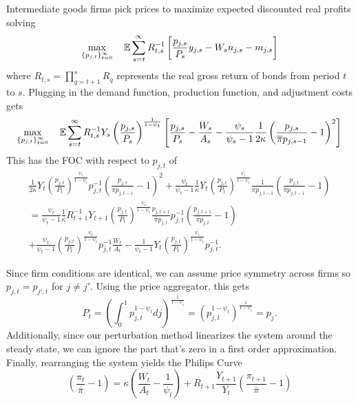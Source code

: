 Intermediate goods firms pick prices to maximize expected discounted real profits solving
\begin{equation*}
    \max_{\{p_{j, t}\}_{t = 0}^\infty} \quad \mathbb{E} \sum_{s = t}^\infty R_{t, s}^{-1} \left[ \frac{p_{j, s}}{P_s} y_{j, s} - W_s n_{j, s} - m_{j, s} \right]
\end{equation*}
where $R_{t, s} = \prod_{q = t + 1}^s R_q$ represents the real gross return of bonds from period $t$ to $s$. Plugging in the demand function, production function, and adjustment costs gets
\begin{equation*}
    \max_{\{p_{j, t}\}_{t = 0}^\infty} \quad \mathbb{E} \sum_{s = t}^\infty R_{t, s}^{-1} Y_s \left(\frac{p_{j, s}}{P_s}\right)^\frac{1}{1 - \psi_t} \left[ \frac{p_{j, s}}{P_s} - \frac{W_s}{A_s} - \frac{\psi_s}{\psi_s - 1} \frac{1}{2 \kappa} \left(\frac{p_{j, s}}{{\overline{\pi} p_{j, s - 1}}} - 1\right)^2 \right]
\end{equation*}
This has the FOC with respect to $p_{j, t}$ of
\begin{align*}
    \frac{1}{2 \kappa} Y_t \left(\frac{p_{j, t}}{P_t}\right)^\frac{\psi_t}{1 - \psi_t} p_{j, t}^{-1} \left(\frac{p_{j, t}}{\overline{\pi} p_{j, t-1}} - 1\right)^2 + \frac{\psi_t}{\psi_t - 1} \frac{1}{\kappa} Y_t \left(\frac{p_{j, t}}{P_t}\right)^\frac{\psi_t}{1 - \psi_t} \frac{1}{\overline{\pi} p_{j, t-1}}\left(\frac{p_{j, t}}{\overline{\pi} p_{j, t-1}} - 1\right) \\
    = \frac{\psi_t}{\psi_t - 1} \frac{1}{\kappa} R_{t+1}^{-1} Y_{t+1} \left(\frac{p_{j, t}}{P_t}\right)^\frac{\psi_t}{1 - \psi_t} \frac{p_{j, t+1}}{\overline{\pi} p_{j, t}} p_{j, t}^{-1} \left(\frac{p_{j, t+1}}{\overline{\pi} p_{j, t}} - 1\right) \\
    + \frac{\psi_t}{\psi_t - 1} \left(\frac{p_{j, t}}{P_t}\right)^\frac{\psi_t}{1 - \psi_t} p_{j, t}^{-1} \frac{W_t}{A_t} - \frac{1}{\psi_t - 1} Y_t \left(\frac{p_{j, t}}{P_t}\right)^\frac{\psi_t}{1 - \psi_t} p_{j, t}^{-1}.
\end{align*}

Since firm conditions are identical, we can assume price symmetry across firms so $p_{j, t} = p_{j', t}$ for $j \neq j'$. Using the price aggregator, this gets
\begin{equation*}
    P_t = \left(\int_0^1 p_{j, t}^{1 - \psi_t} dj \right)^\frac{1}{1 - \psi_t} = \left(p_{j, t}^{1 - \psi_t} \right)^\frac{1}{1 - \psi_t} = p_j.
\end{equation*}
Additionally, since our perturbation method linearizes the system around the steady state, we can ignore the part that's zero in a first order approximation. Finally, rearranging the system yields the Philips Curve
\begin{equation*}
    \left(\frac{\pi_t}{\overline{\pi}} - 1\right) = \kappa \left(\frac{W_t}{A_t} - \frac{1}{\psi_t}\right) + R_{t+1} \frac{Y_{t+1}}{Y_t} \left(\frac{\pi_{t+1}}{\overline{\pi}} - 1\right) 
\end{equation*}

